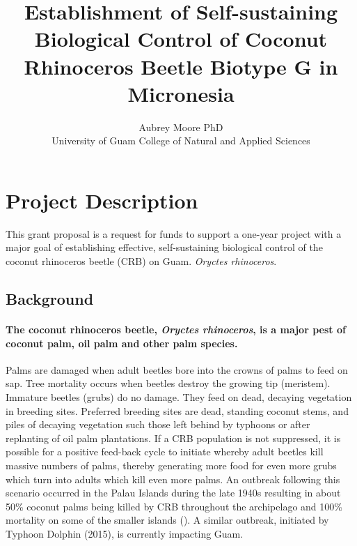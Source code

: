 \documentclass[12pt,letterpaper,english,bibliography=totocnumbered, abstract=on]{scrartcl}
\begin{document}
\titlehead{Grant Proposal: DOI-OIA Coral Reef and Natural Resources Initiative FY2020}

\title{Establishment of Self-sustaining Biological Control of Coconut Rhinoceros Beetle Biotype G in Micronesia }

\author{Aubrey Moore PhD\\University of Guam College of Natural and Applied Sciences}

\maketitle
\newpage
\tableofcontents

\pagebreak

\section{Project Description}


This grant proposal is a request for funds to support a one-year project with a major goal of establishing effective, self-sustaining biological control of the coconut rhinoceros beetle (CRB) on Guam. \textit{Oryctes rhinoceros}.

\subsection{Background}

\paragraph{The coconut rhinoceros beetle, \emph{Oryctes rhinoceros}, is a major
pest of coconut palm, oil palm and other palm species.}

Palms are damaged when adult beetles bore into the crowns of palms
to feed on sap. Tree mortality occurs when beetles destroy the growing
tip (meristem). Immature beetles (grubs) do no damage. They feed on
dead, decaying vegetation in breeding sites. Preferred breeding sites
are dead, standing coconut stems, and piles of decaying vegetation
such those left behind by typhoons or after replanting of oil palm
plantations. If a CRB population is not suppressed, it is possible
for a positive feed-back cycle to initiate whereby adult beetles kill
massive numbers of palms, thereby generating more food for even more
grubs which turn into adults which kill even more palms. An outbreak
following this scenario occurred in the Palau Islands during the late
1940s resulting in about 50\% coconut palms being killed by CRB throughout
the archipelago and 100\% mortality on some of the smaller islands
(\cite{gressitt_coconut_1953}). A similar outbreak, initiated by Typhoon Dolphin (2015), is currently impacting Guam.
\end{document}
